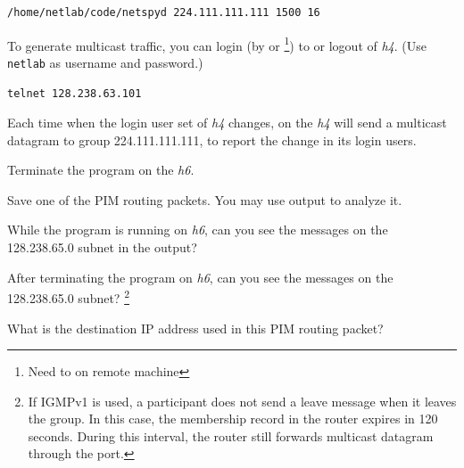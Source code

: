 \documentclass{../UTNetLab}
\begin{document}
\begin{lstlisting}
/home/netlab/code/netspyd 224.111.111.111 1500 16
\end{lstlisting}

To generate multicast traffic, you can login (by  or \footnote{Need to  on remote machine}) to or logout of \textit{h4}.
(Use \texttt{netlab} as username and password.)

\begin{lstlisting}
telnet 128.238.63.101
\end{lstlisting}

Each time when the login user set of \textit{h4} changes,  on the \textit{h4} will send a multicast datagram to group 224.111.111.111, to report the change in its login users.


Terminate the  program on the \textit{h6}.


Save one of the PIM routing packets.
You may use  output to analyze it.

\begin{report}
    \item While the  program is running on \textit{h6},
    can you see the  messages on the 128.238.65.0 subnet in the  output?

    \item After terminating the  program on \textit{h6},
    can you see the  messages on the 128.238.65.0 subnet?%
    \footnote{If IGMPv1 is used, a participant does not send a leave message when it leaves the group.
        In this case, the membership record in the router expires in 120 seconds.
        During this interval, the router still forwards multicast datagram through the port.}

    \item What is the destination IP address used in this PIM routing packet?
\end{report}
\end{document}
